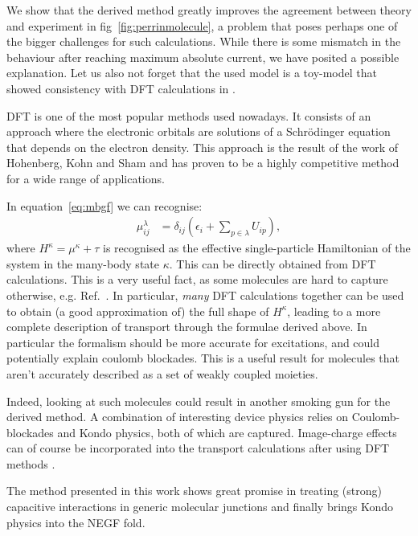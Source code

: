 \documentclass{article}
\begin{document}
\begin{multicols}{2}
    We show that the derived method greatly improves the agreement between theory and experiment in fig~\ref{fig:perrinmolecule}, a problem that poses perhaps one of the bigger challenges for such calculations. While there is some mismatch in the behaviour after reaching maximum absolute current, we have posited a possible explanation. Let us also not forget that the used model is a toy-model that showed consistency with DFT calculations in \citet{perrinnano}.
    
    DFT is one of the most popular methods used nowadays. It consists of an approach where the electronic orbitals are solutions of a Schr\"odinger equation that depends on the electron density. This approach is the result of the work of Hohenberg, Kohn and Sham \cite{Hohenberg1964, kohnsham, nobel1998} and has proven to be a highly competitive method for a wide range of applications.
    
    In equation~\ref{eq:mbgf} we can recognise:
    \begin{align}
    \mu^\lambda_{ij} &= \delta_{ij} \left( \epsilon_i + \sum_{p\in\lambda} U_{ip} \right) \label{eq:result},
    \end{align} 
    where $H^\kappa = \mu^\kappa + \tau$ is recognised as the effective single-particle Hamiltonian of the system in the many-body state $\kappa$. This can be directly obtained from DFT calculations. This is a very useful fact, as some molecules are hard to capture otherwise, e.g. Ref.~\cite{frisenda}. In particular, \emph{many} DFT calculations together can be used to obtain (a good approximation of) the full shape of $H^\kappa$, leading to a more complete description of transport through the formulae derived above. In particular the formalism should be more accurate for excitations, and could potentially explain coulomb blockades. This is a useful result for molecules that aren't accurately described as a set of weakly coupled moieties.
    
    Indeed, looking at such molecules could result in another smoking gun for the derived method. A combination of interesting device physics relies on Coulomb-blockades and Kondo physics, both of which are captured. Image-charge effects can of course be incorporated into the transport calculations after using DFT methods \cite{Perrin2013, verzijlgil}. 
    
    The method presented in this work shows great promise in treating (strong) capacitive interactions in generic molecular junctions and finally brings Kondo physics into the NEGF fold. 
    
     
\end{multicols}
\end{document}
